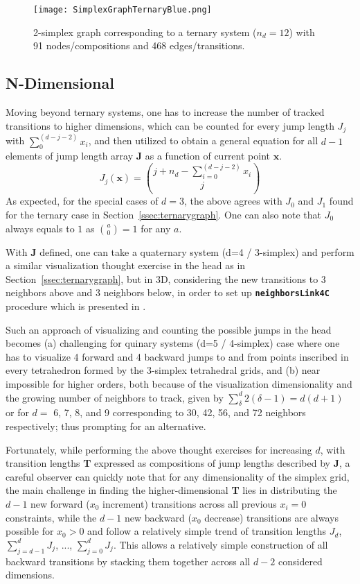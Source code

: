 \begin{figure}[h]
    \centering
    \texttt{[image: SimplexGraphTernaryBlue.png]}
    \caption{2-simplex graph corresponding to a ternary system ($n_d=12$) with 91 nodes/compositions and 468 edges/transitions.} 
    \label{fig:ternarysimplexgraph}
\end{figure}

\subsection{N-Dimensional} \label{ssec:ndimgraph}

Moving beyond ternary systems, one has to increase the number of tracked transitions to higher dimensions, which can be counted for every jump length $J_j$ with $\sum_0^{(d-j-2)}x_i$, and then utilized to obtain a general equation for all $d-1$ elements of jump length array $\textbf{J}$ as a function of current point $\textbf{x}$.
\begin{equation}
    J_{j}(\textbf{x})= \binom{j+n_d- \sum_{i=0}^{(d-j-2)} x_i}{j}
    \label{eq:jj}
\end{equation}
As expected, for the special cases of $d=3$, the above agrees with $J_0$ and $J_1$ found for the ternary case in Section~\ref{ssec:ternarygraph}. One can also note that $J_0$ always equals to $1$ as $\binom{a}{0} = 1$ for any $a$.

With $\textbf{J}$ defined, one can take a quaternary system (d=4 / 3-simplex) and perform a similar visualization thought exercise in the head as in Section~\ref{ssec:ternarygraph}, but in 3D, considering the new transitions to 3 neighbors above and 3 neighbors below, in order to set up \texttt{\textbf{neighborsLink4C}} procedure which is presented in . 

Such an approach of visualizing and counting the possible jumps in the head becomes (a) challenging for quinary systems (d=5 / 4-simplex) case where one has to visualize 4 forward and 4 backward jumps to and from points inscribed in every tetrahedron formed by the 3-simplex tetrahedral grids, and (b) near impossible for higher orders, both because of the visualization dimensionality and the growing number of neighbors to track, given by $\sum_\delta^d 2(\delta-1)= d(d+1)$ or for $d=$ 6, 7, 8, and 9 corresponding to 30, 42, 56, and 72 neighbors respectively; thus prompting for an alternative.

Fortunately, while performing the above thought exercises for increasing $d$, with transition lengths \textbf{T} expressed as compositions of jump lengths described by \textbf{J}, a careful observer can quickly note that for any dimensionality of the simplex grid, the main challenge in finding the higher-dimensional \textbf{T} lies in distributing the $d-1$ new forward ($x_0$ increment) transitions across all previous $x_i=0$ constraints, while the $d-1$ new backward ($x_0$ decrease) transitions are always possible for $x_0>0$ and follow a relatively simple trend of transition lengths $J_d$, $\sum_{j=d-1}^{d}J_j$, ..., $\sum_{j=0}^{d}J_j$. This allows a relatively simple construction of all backward transitions by stacking them together across all $d-2$ considered dimensions. 

